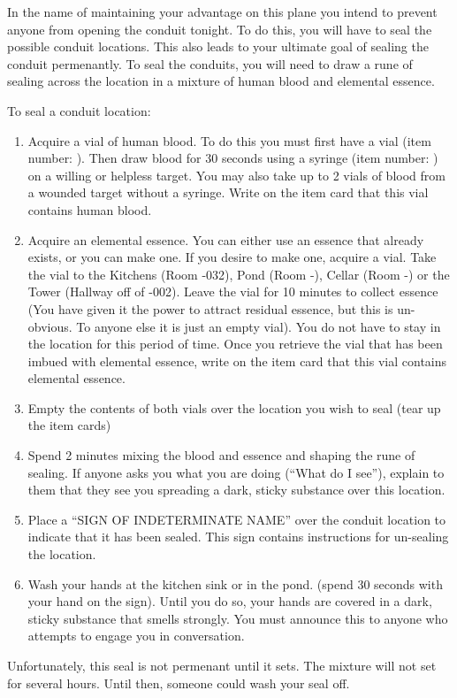 \documentclass[green]{elementals}
\begin{document}
\name{\gSealingLocations{}}

In the name of maintaining your advantage on this plane you intend to prevent anyone from opening the conduit tonight.  To do this, you will have to seal the possible conduit locations. This also leads to your ultimate goal of sealing the conduit permenantly. To seal the conduits, you will need to draw a rune of sealing across the location in a mixture of human blood and elemental essence.

To seal a conduit location:
\begin{enumerate}
  \item Acquire a vial of human blood. To do this you must first have a vial (item number: ). Then draw blood for 30 seconds using a syringe (item number: ) on a willing or helpless target. You may also take up to 2 vials of blood from a wounded target without a syringe. Write on the item card that this vial contains human blood.
  \item Acquire an elemental essence. You can either use an essence that already exists, or you can make one. If you desire to make one, acquire a vial. Take the vial to the Kitchens (Room -032), Pond (Room -), Cellar (Room -) or the Tower (Hallway off of -002). Leave the vial for 10 minutes to collect essence (You have given it the power to attract residual essence, but this is un-obvious. To anyone else it is just an empty vial). You do not have to stay in the location for this period of time. Once you retrieve the vial that has been imbued with elemental essence, write on the item card that this vial contains elemental essence.
  \item Empty the contents of both vials over the location you wish to seal (tear up the item cards)
  \item Spend 2 minutes mixing the blood and essence and shaping the rune of sealing. If anyone asks you what you are doing (``What do I see''), explain to them that they see you spreading a dark, sticky substance over this location.
  \item Place a ``SIGN OF INDETERMINATE NAME'' over the conduit location to indicate that it has been sealed. This sign contains instructions for un-sealing the location.
  \item Wash your hands at the kitchen sink or in the pond. (spend 30 seconds with your hand on the sign). Until you do so, your hands are covered in a dark, sticky substance that smells strongly. You must announce this to anyone who attempts to engage you in conversation.
\end{enumerate}
Unfortunately, this seal is not permenant until it sets. The mixture will not set for several hours. Until then, someone could wash your seal off.
\end{document}
